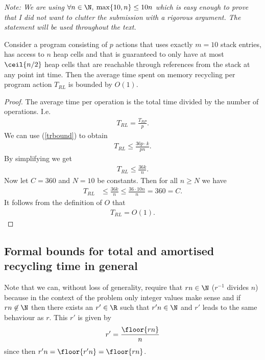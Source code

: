 \documentclass{article}
\begin{document}
\emph{Note: We are using $\forall n\in\N,\:\max\{10,n\}\leq 10n$ which is
easy enough to prove that I did not want to clutter the submission with a
rigorous argument. The statement will be used throughout the text.}

\begin{claim}
    Consider a program consisting of $p$ actions that uses exactly $m=10$
    stack entries, has access to $n$ heap cells and that is guaranteed to only
    have at most $\ceil{n/2}$ heap cells that are reachable through references
    from the stack at any point int time. 
    Then the average time spent on memory recycling per program
    action $T_{RL}$ is bounded by $O(1)$.
\end{claim}
\begin{proof}
    The average time per operation is the total time divided by the number 
    of operations.
    I.e.
    \begin{align*}
        T_{RL} = \frac{T_{RP}}{p}.
    \end{align*}
    We can use (\ref{trbound}) to obtain
    \begin{align*}
        T_{RL} \leq \frac{36p\cdot k}{pn}.
    \end{align*}
    By simplifying we get
    \begin{align*}
        T_{RL} \leq \frac{36k}{n}.
    \end{align*}
    Now let $C=360$ and $N=10$ be constants. Then for all $n\geq N$
    we have
    \begin{align*}
        T_{RL} &\leq \frac{36k}{n} \leq \frac{36\cdot10n}{n} = 360 = C.
    \end{align*}
    It follows from the definition of $O$ that
    \begin{align*}
        T_{RL} = O(1).
    \end{align*}
\end{proof}

\subsection{Formal bounds for total and amortised recycling time in general}

Note that we can, without loss of generality, require that $rn\in\N$ ($r^{-1}$ divides $n$)
because in the context of the problem only integer values make sense and if
$rn\not\in\N$ then there exists an $r'\in\R$ such that $r'n\in\N$ and $r'$ leads 
to the same behaviour as $r$. This $r'$ is given by
\begin{align*}
    r'=\frac{\floor{rn}}{n}
\end{align*}
since then $r'n=\floor{r'n}=\floor{rn}$.
\end{document}

